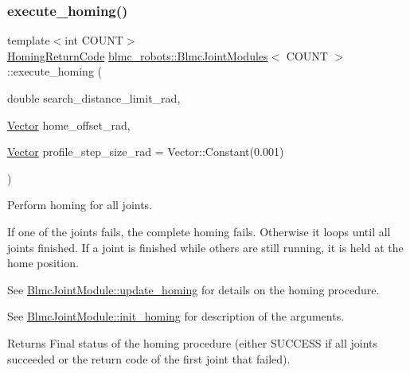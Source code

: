 \subsubsection{\texorpdfstring{execute\+\_\+homing()}{execute\_homing()}}
{\footnotesize\ttfamily template$<$int C\+O\+U\+NT$>$ \\
\hyperlink{blmc__joint__module_8hpp_aa1075809042ff261e4b0a20d161448b6}{Homing\+Return\+Code} \hyperlink{classblmc__robots_1_1BlmcJointModules}{blmc\+\_\+robots\+::\+Blmc\+Joint\+Modules}$<$ C\+O\+U\+NT $>$\+::execute\+\_\+homing (\begin{DoxyParamCaption}\item[{double}]{search\+\_\+distance\+\_\+limit\+\_\+rad,  }\item[{\hyperlink{classblmc__robots_1_1BlmcJointModules_abaff382c6fd4b494ec0c17498d94919e}{Vector}}]{home\+\_\+offset\+\_\+rad,  }\item[{\hyperlink{classblmc__robots_1_1BlmcJointModules_abaff382c6fd4b494ec0c17498d94919e}{Vector}}]{profile\+\_\+step\+\_\+size\+\_\+rad = {\ttfamily Vector\+:\+:Constant(0.001)} }\end{DoxyParamCaption})\hspace{0.3cm}{\ttfamily [inline]}}



Perform homing for all joints. 

If one of the joints fails, the complete homing fails. Otherwise it loops until all joints finished. If a joint is finished while others are still running, it is held at the home position.

See \hyperlink{classblmc__robots_1_1BlmcJointModule_abb2712542f3c340bc0ecf76bd343b6b3}{Blmc\+Joint\+Module\+::update\+\_\+homing} for details on the homing procedure.

See \hyperlink{classblmc__robots_1_1BlmcJointModule_aa534604b5ead6a3eee5c47a9454f6834}{Blmc\+Joint\+Module\+::init\+\_\+homing} for description of the arguments.

\begin{DoxyReturn}{Returns}
Final status of the homing procedure (either S\+U\+C\+C\+E\+SS if all joints succeeded or the return code of the first joint that failed). 
\end{DoxyReturn}
\mbox{\label{classblmc__robots_1_1BlmcJointModules_afa312ed7c7c5129b547b26b6fa3bab2e}} 
